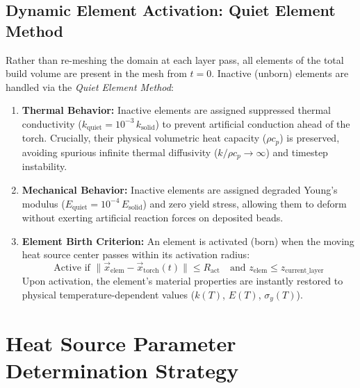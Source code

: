 \documentclass[10pt,a4paper]{article}
\begin{document}
\subsection{Dynamic Element Activation: Quiet Element Method}
Rather than re-meshing the domain at each layer pass, all elements of the total build volume are present in the mesh from $t = 0$. Inactive (unborn) elements are handled via the \textit{Quiet Element Method}:
\begin{enumerate}
    \item \textbf{Thermal Behavior:} Inactive elements are assigned suppressed thermal conductivity ($k_{\mathrm{quiet}} = 10^{-3}\,k_{\mathrm{solid}}$) to prevent artificial conduction ahead of the torch. Crucially, their physical volumetric heat capacity ($\rho c_p$) is preserved, avoiding spurious infinite thermal diffusivity ($k/\rho c_p \to \infty$) and timestep instability.
    \item \textbf{Mechanical Behavior:} Inactive elements are assigned degraded Young's modulus ($E_{\mathrm{quiet}} = 10^{-4}\,E_{\mathrm{solid}}$) and zero yield stress, allowing them to deform without exerting artificial reaction forces on deposited beads.
    \item \textbf{Element Birth Criterion:} An element is activated (born) when the moving heat source center passes within its activation radius:
    \begin{equation}
    \text{Active if } \|\vec{x}_{\mathrm{elem}} - \vec{x}_{\mathrm{torch}}(t)\| \le R_{\mathrm{act}} \quad \text{and } z_{\mathrm{elem}} \le z_{\mathrm{current\_layer}}
    \end{equation}
    Upon activation, the element's material properties are instantly restored to physical temperature-dependent values ($k(T)$, $E(T)$, $\sigma_y(T)$).
\end{enumerate}

\section{Heat Source Parameter Determination Strategy}
\end{document}
